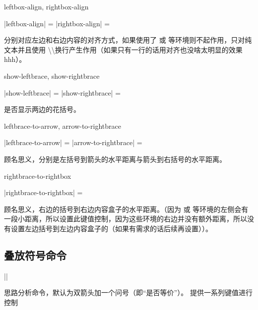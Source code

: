 \documentclass{xdyy-usermanual}
\begin{document}
\begin{function}[added = 2022-01-12]{leftbox-align, rightbox-align}
  \begin{syntax}
    |leftbox-align| =  
    |rightbox-align| =  
  \end{syntax}
  分别对应左边和右边内容的对齐方式，如果使用了  或  等环境则不起作用，只对纯文本并且使用 \textbackslash \textbackslash 换行产生作用（如果只有一行的话用对齐也没啥太明显的效果hhh）。
\end{function}

\begin{function}[added = 2022-01-12]{show-leftbrace, show-rightbrace}
  \begin{syntax}
    |show-leftbrace| =  
    |show-rightbrace| =  
  \end{syntax}
  是否显示两边的花括号。
\end{function}

\begin{function}[added = 2022-01-12]{leftbrace-to-arrow, arrow-to-rightbrace}
  \begin{syntax}
    |leftbrace-to-arrow| =  \init{7pt}
    |arrow-to-rightbrace| =  \init{2pt}
  \end{syntax}
  顾名思义，分别是左括号到箭头的水平距离与箭头到右括号的水平距离。
\end{function}

\begin{function}[added = 2022-01-12]{rightbrace-to-rightbox}
  \begin{syntax}
    |rightbrace-to-rightbox| =  \init{3mm}
  \end{syntax}
  顾名思义，右边的括号到右边内容盒子的水平距离。（因为  或  等环境的左侧会有一段小距离，所以设置此键值控制，因为这些环境的右边并没有额外距离，所以没有设置左边括号到左边内容盒子的（如果有需求的话后续再设置））。
\end{function}



\subsection{叠放符号命令 }

\begin{function}[added = 2022-2-21]{\overlay}
  \begin{syntax}
    |\overlay| 
  \end{syntax}
  思路分析命令，默认为双箭头加一个问号（即“是否等价”）。 提供一系列键值进行控制
  \begin{hexample}
      \overlay
  \end{hexample}
\end{function}
\end{document}
